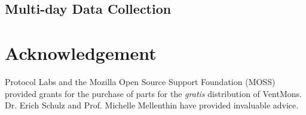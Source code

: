 \documentclass{article}
\begin{document}
\subsection{Multi-day Data Collection}

\section*{Acknowledgement}

Protocol Labs and the Mozilla Open Source Support Foundation (MOSS) provided
grants for the purchase of parts for the {\it gratis} distribution of VentMons.
Dr. Erich Schulz and Prof. Michelle Mellenthin have provided invaluable advice.





\end{document}
